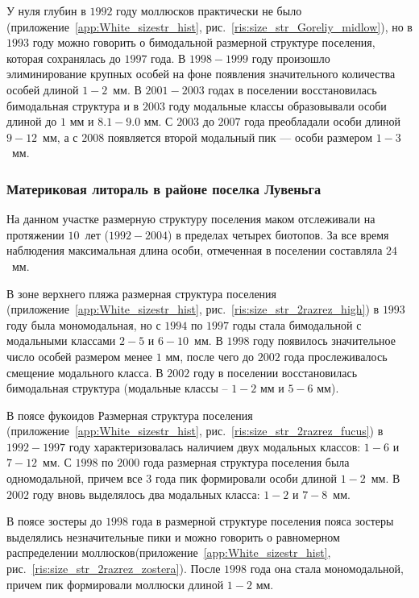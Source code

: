 У нуля глубин в $1992$ году моллюсков практически не было (приложение~\ref{app:White_sizestr_hist}, рис.~\ref{ris:size_str_Goreliy_midlow}), но в $1993$ году можно говорить о бимодальной размерной структуре поселения, которая сохранялась до $1997$ года. 
В $1998-1999$ году произошло элиминирование крупных особей на фоне появления значительного количества особей длиной $1-2$~мм. 
В $2001-2003$ годах в поселении восстановилась бимодальная структура и в $2003$ году модальные классы образовывали особи длиной до $1$ мм и $8.1-9.0$ мм. 
С $2003$ до $2007$ года преобладали особи длиной $9-12$~мм, а с $2008$ появляется второй модальный пик --- особи размером $1-3$~мм.


		\subsubsection*{Материковая литораль в районе поселка Лувеньга}
На данном участке размерную структуру поселения маком отслеживали на протяжении $10$~лет ($1992 - 2004$) в пределах четырех биотопов.
За все время наблюдения максимальная длина особи, отмеченная в поселении составляла $24$~мм.

В зоне верхнего пляжа размерная структура поселения (приложение~\ref{app:White_sizestr_hist}, рис.~\ref{ris:size_str_2razrez_high}) в $1993$ году была мономодальная, но с $1994$ по $1997$ годы стала бимодальной с модальными классами $2-5$ и $6-10$~мм.
В $1998$ году появилось значительное число особей размером менее $1$ мм, после чего до $2002$ года прослеживалось смещение модального класса. 
В $2002$ году в поселении восстановилась бимодальная структура (модальные классы -- $1-2$ мм и $5-6$ мм).

В поясе фукоидов Размерная структура поселения (приложение~\ref{app:White_sizestr_hist}, рис.~\ref{ris:size_str_2razrez_fucus}) в $1992-1997$ году характеризовалась наличием двух модальных классов: $1-6$ и $7-12$~мм. 
С $1998$ по $2000$ года размерная структура поселения была одномодальной, причем все $3$ года пик формировали особи длиной $1-2$~мм. 
В $2002$ году вновь выделялось два модальных класса: $1-2$ и $7-8$~мм.

В поясе зостеры до $1998$ года в размерной структуре поселения пояса зостеры выделялись незначительные пики и можно говорить о равномерном распределении моллюсков(приложение~\ref{app:White_sizestr_hist}, рис.~\ref{ris:size_str_2razrez_zostera}). 
После $1998$ года она стала мономодальной, причем пик формировали моллюски длиной $1-2$ мм.


